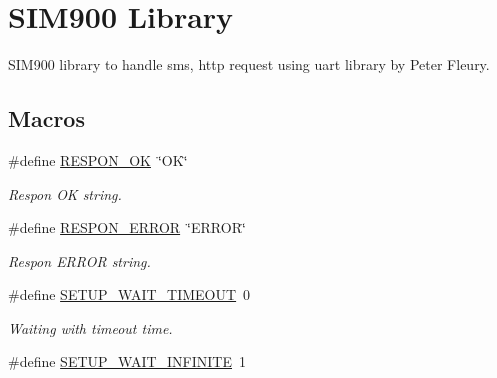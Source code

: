\hypertarget{group__ex4__sim900}{\section{S\-I\-M900 Library}
\label{group__ex4__sim900}
}


S\-I\-M900 library to handle sms, http request using uart library by Peter Fleury.  


\subsection*{Macros}
\begin{DoxyCompactItemize}
\item 
\hypertarget{group__ex4__sim900_gad14389a3a2f35320404d884acd72ca43}{\#define \hyperlink{group__ex4__sim900_gad14389a3a2f35320404d884acd72ca43}{R\-E\-S\-P\-O\-N\-\_\-\-O\-K}~\char`\"{}O\-K\char`\"{}}\label{group__ex4__sim900_gad14389a3a2f35320404d884acd72ca43}

\begin{DoxyCompactList}\small\item\em Respon O\-K string. \end{DoxyCompactList}\item 
\hypertarget{group__ex4__sim900_gadceb007a036c1902655465ed31fca63d}{\#define \hyperlink{group__ex4__sim900_gadceb007a036c1902655465ed31fca63d}{R\-E\-S\-P\-O\-N\-\_\-\-E\-R\-R\-O\-R}~\char`\"{}E\-R\-R\-O\-R\char`\"{}}\label{group__ex4__sim900_gadceb007a036c1902655465ed31fca63d}

\begin{DoxyCompactList}\small\item\em Respon E\-R\-R\-O\-R string. \end{DoxyCompactList}\item 
\hypertarget{group__ex4__sim900_ga5cc2c4b9a9cbfc6af3b1036dc4294aa6}{\#define \hyperlink{group__ex4__sim900_ga5cc2c4b9a9cbfc6af3b1036dc4294aa6}{S\-E\-T\-U\-P\-\_\-\-W\-A\-I\-T\-\_\-\-T\-I\-M\-E\-O\-U\-T}~0}\label{group__ex4__sim900_ga5cc2c4b9a9cbfc6af3b1036dc4294aa6}

\begin{DoxyCompactList}\small\item\em Waiting with timeout time. \end{DoxyCompactList}\item 
\hypertarget{group__ex4__sim900_ga50b6c8e77c367532a75db7366e900020}{\#define \hyperlink{group__ex4__sim900_ga50b6c8e77c367532a75db7366e900020}{S\-E\-T\-U\-P\-\_\-\-W\-A\-I\-T\-\_\-\-I\-N\-F\-I\-N\-I\-T\-E}~1}\label{group__ex4__sim900_ga50b6c8e77c367532a75db7366e900020}


\end{DoxyCompactItemize}
